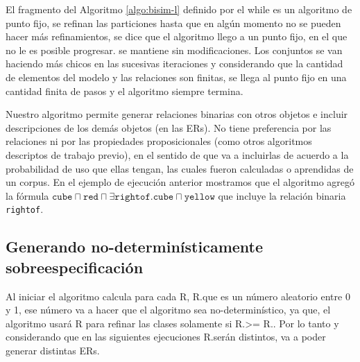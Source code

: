 El fragmento del Algoritmo \ref{algo:bisim-l} definido por el while es un algoritmo de punto fijo, se refinan las particiones hasta que en alg\'un momento no se pueden hacer m\'as refinamientos, se dice que el algoritmo llego a un punto fijo, en el que no le es posible progresar. \RE se mantiene sin modificaciones. Los conjuntos se van haciendo m\'as chicos en las sucesivas iteraciones y considerando que la cantidad de elementos del modelo y las relaciones son finitas, se llega al punto fijo en una cantidad finita de pasos y el algoritmo siempre termina.

Nuestro algoritmo permite generar relaciones binarias con otros objetos e incluir descripciones de los dem\'as objetos (en las ERs). No tiene preferencia por las relaciones ni por las propiedades proposicionales (como otros algoritmos descriptos de trabajo previo), en el sentido de que va a incluirlas de acuerdo a la probabilidad de uso que ellas tengan, las cuales fueron calculadas o aprendidas de un corpus. En el ejemplo de ejecuci\'on anterior mostramos que el algoritmo agreg\'o la f\'ormula $\texttt{cube} \sqcap \texttt{red} \sqcap \exists \texttt{rightof}. \texttt{cube} \sqcap \texttt{yellow}$ que incluye la relaci\'on binaria \texttt{rightof}.

\subsection{Generando no-determin\'isticamente sobreespecificaci\'on}
\label{sec:overspecification}



Al iniciar el algoritmo calcula para cada R, R.\randomuse que es un n\'umero aleatorio entre 0 y 1, ese n\'umero va a hacer que el algoritmo sea no-determin\'istico, ya que, el algoritmo usar\'a R para refinar las clases solamente si 
R.\randomuse >= R.\puse. Por lo tanto y considerando que en las siguientes ejecuciones R.\randomuse ser\'an distintos, va a poder generar distintas ERs.


